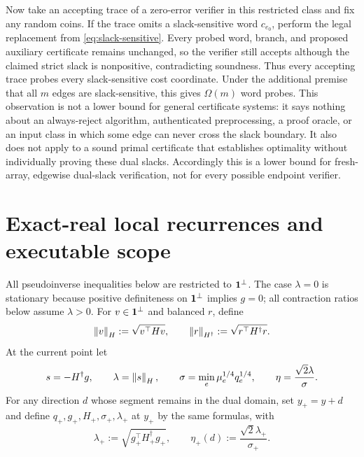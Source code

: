 Now take an accepting trace of a zero-error verifier in this restricted class
and fix any random coins.
If the trace omits a slack-sensitive word $c_{e_0}$, perform the legal replacement
from \cref{eq:slack-sensitive}.  Every probed word, branch, and proposed auxiliary
certificate remains unchanged, so the verifier still accepts although the
claimed strict slack is nonpositive, contradicting soundness.  Thus every
accepting trace probes every slack-sensitive cost coordinate.  Under the
additional premise that all $m$ edges are slack-sensitive, this gives
$\Omega(m)$ word probes.  This observation is not a lower bound for general
certificate systems: it says nothing about an always-reject algorithm,
authenticated preprocessing, a proof oracle, or an input class in which some
edge can never cross the slack boundary.  It also does not apply to a sound
primal certificate that establishes optimality without individually proving
these dual slacks.  Accordingly this is a lower bound for fresh-array,
edgewise dual-slack verification, not for every possible endpoint verifier.

\section{Exact-real local recurrences and executable scope}
\label{app:local}

All pseudoinverse inequalities below are restricted to $\mathbf{1}^\perp$.  The case
$\lambda=0$ is stationary because positive definiteness on $\mathbf{1}^\perp$
implies $g=0$; all contraction ratios below assume $\lambda>0$.  For
$v\in\mathbf{1}^\perp$ and balanced $r$, define
\begin{equation}
 \left\lVert v\right\rVert_H:=\sqrt{v^\top Hv},
 \qquad
 \left\lVert r\right\rVert_{H^\dagger}:=\sqrt{r^\top H^\dagger r}.
 \label{eq:energy-norms}
\end{equation}
At the current point let
\begin{equation}
 s=-H^\dagger g,\qquad
 \lambda=\left\lVert s\right\rVert_H,\qquad
 \sigma=\min_e\mu_e^{1/4}q_e^{1/4},\qquad
 \eta=\frac{\sqrt2\lambda}{\sigma}.
 \label{eq:local-quantities}
\end{equation}
For any direction $d$ whose segment remains in the dual domain, set
$y_+=y+d$ and define $q_+,g_+,H_+,\sigma_+,\lambda_+$ at $y_+$ by the same
formulas, with
\begin{equation}
 \lambda_+:=\sqrt{g_+^\top H_+^\dagger g_+},
 \qquad
 \eta_+(d):=\frac{\sqrt2\lambda_+}{\sigma_+}.
 \label{eq:eta-plus-definition}
\end{equation}

